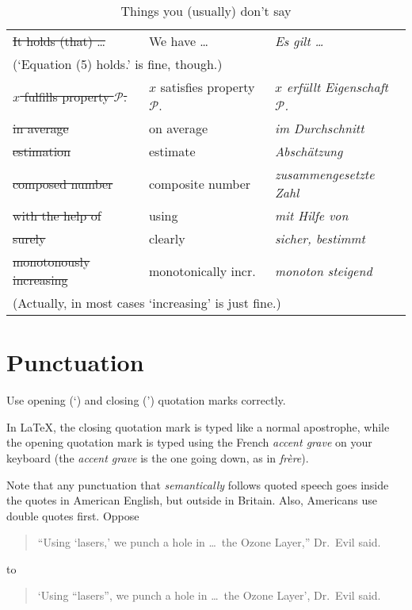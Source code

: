 \begin{table}
  \centering
  \caption{Things you (usually) don't say}
  \label{tab:things-you-dont-say}
  \begin{tabular}{lll}
    \toprule
    \st{It holds (that) \dots} & We have \dots & \emph{Es gilt \dots}\\
    \multicolumn{3}{l}{\quad\footnotesize(`Equation (5) holds.' is fine, though.)}\\
    \st{$x$ fulfills property $\mathcal{P}$.}& \(x\) satisfies property \(\mathcal{P}\). & \emph{\(x\) erfüllt Eigenschaft \(\mathcal{P}\).} \\
    \st{in average} & on average & \emph{im Durchschnitt}\\
    \st{estimation} & estimate   & \emph{Abschätzung}\\
    \st{composed number} & composite number & \emph{zusammengesetzte Zahl}\\
    \st{with the help of} & using & \emph{mit Hilfe von}\\
    \st{surely} & clearly & \emph{sicher, bestimmt}\\
    \st{monotonously increasing} & monotonically incr. & \emph{monoton steigend}\\
    \multicolumn{3}{l}{\quad\footnotesize(Actually, in most cases `increasing' is just fine.)}\\
    \bottomrule
  \end{tabular}
\end{table}







\section*{Punctuation}

\begin{Rule}
  Use opening (`) and closing (') quotation marks correctly.
\end{Rule}

In \LaTeX, the closing quotation mark is typed like a normal
apostrophe, while the opening quotation mark is typed using the French
\emph{accent grave} on your keyboard (the \emph{accent grave} is the
one going down, as in \emph{frère}).

Note that any punctuation that \emph{semantically} follows quoted
speech goes inside the quotes in American English, but outside in
Britain.  Also, Americans use double quotes first.  Oppose
\begin{quote}
  ``Using `lasers,' we punch a hole in \ldots\ the Ozone Layer,''
  Dr.\ Evil said.
\end{quote}
to
\begin{quote}
  `Using ``lasers'', we punch a hole in \ldots\ the Ozone Layer',
  Dr.\ Evil said.
\end{quote}

